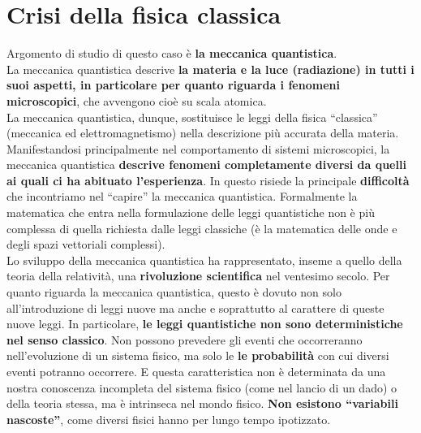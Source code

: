 \pagestyle{VS}
\chapter{Crisi della fisica classica}
Argomento di studio di questo caso è \textbf{la meccanica quantistica}.\\
La meccanica quantistica descrive \textbf{la materia e la luce (radiazione) in tutti i suoi aspetti, in particolare per quanto riguarda i fenomeni microscopici}, che avvengono cioè su scala atomica.\\
La meccanica quantistica, dunque, sostituisce le leggi della fisica ``classica'' (meccanica ed elettromagnetismo) nella descrizione più accurata della materia. Manifestandosi principalmente nel comportamento di sistemi microscopici, la meccanica quantistica \textbf{descrive fenomeni completamente diversi da quelli ai quali ci ha abituato l'esperienza}. In questo risiede la principale \textbf{difficoltà} che incontriamo nel ``capire'' la meccanica quantistica. Formalmente la matematica che entra nella formulazione delle leggi quantistiche non è più complessa di quella richiesta dalle leggi classiche (è la matematica delle onde e degli spazi vettoriali complessi).\\
Lo sviluppo della meccanica quantistica ha rappresentato, inseme a quello della teoria della relatività, una \textbf{rivoluzione scientifica} nel ventesimo secolo. Per quanto riguarda la meccanica quantistica, questo è dovuto non solo all'introduzione di leggi nuove ma anche e soprattutto al carattere di queste nuove leggi. In particolare, \textbf{le leggi quantistiche non sono deterministiche nel senso classico}. Non possono prevedere gli eventi che occorreranno nell'evoluzione di un sistema fisico, ma solo le \textbf{le probabilità} con cui diversi eventi potranno occorrere. E questa caratteristica non è determinata da una nostra conoscenza incompleta del sistema fisico (come nel lancio di un dado) o della teoria stessa, ma è intrinseca nel mondo fisico. \textbf{Non esistono ``variabili nascoste''}, come diversi fisici hanno per lungo tempo ipotizzato.\\

